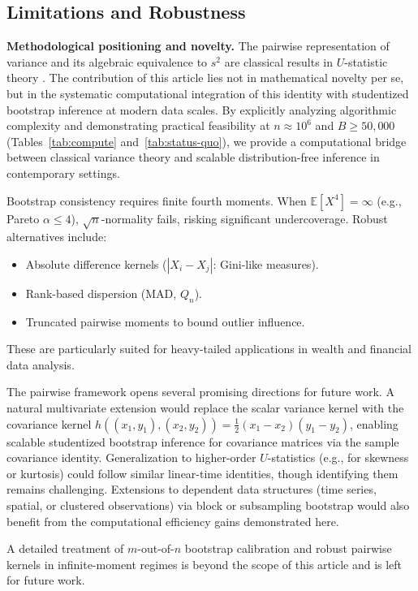 \documentclass[12pt,a4paper]{article}
\begin{document}
\subsection{Limitations and Robustness}

\textbf{Methodological positioning and novelty.}
The pairwise representation of variance and its algebraic equivalence to $s^2$ are classical results in $U$-statistic theory \citep{serfling1980,lee1990}. The contribution of this article lies not in mathematical novelty per se, but in the systematic computational integration of this identity with studentized bootstrap inference at modern data scales. By explicitly analyzing algorithmic complexity and demonstrating practical feasibility at $n \approx 10^6$ and $B \ge 50{,}000$ (Tables~\ref{tab:compute} and~\ref{tab:status-quo}), we provide a computational bridge between classical variance theory and scalable distribution-free inference in contemporary settings.

Bootstrap consistency requires finite fourth moments. When $\mathbb{E}[X^4] = \infty$ (e.g., Pareto $\alpha \le 4$), $\sqrt{n}$-normality fails, risking significant undercoverage. Robust alternatives include:
\begin{itemize}
    \item Absolute difference kernels ($|X_i - X_j|$: Gini-like measures).
    \item Rank-based dispersion (MAD, $Q_n$).
    \item Truncated pairwise moments to bound outlier influence.
\end{itemize}
These are particularly suited for heavy-tailed applications in wealth and financial data analysis.

The pairwise framework opens several promising directions for future work. A natural multivariate extension would replace the scalar variance kernel with the covariance kernel $h((x_1,y_1),(x_2,y_2)) = \frac{1}{2}(x_1-x_2)(y_1-y_2)$, enabling scalable studentized bootstrap inference for covariance matrices via the sample covariance identity. Generalization to higher-order $U$-statistics (e.g., for skewness or kurtosis) could follow similar linear-time identities, though identifying them remains challenging. Extensions to dependent data structures (time series, spatial, or clustered observations) via block or subsampling bootstrap would also benefit from the computational efficiency gains demonstrated here.

A detailed treatment of $m$-out-of-$n$ bootstrap calibration and robust pairwise kernels in infinite-moment regimes is beyond the scope of this article and is left for future work.
\end{document}
